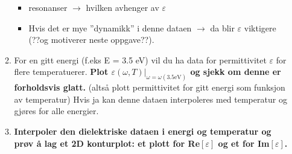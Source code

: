 \begin{itemize}
\begin{enumerate}
\begin{itemize}
            \item resonanser $\rightarrow$ hvilken avhenger av $\varepsilon$

            \item Hvis det er mye ''dynamikk'' i denne dataen $\rightarrow$ da blir $\varepsilon$
               viktigere (??og motiverer neste oppgave??).
            \end{itemize}
         \item 
            For en gitt energi (f.eks E = 3.5 eV) vil du ha data for permittivitet $\varepsilon$
            for flere temperatuerer. 
            \textbf{Plot $\varepsilon(\omega,T)\big|_{\omega=\omega(3.5\text{eV})}$ 
            og sjekk om denne er forholdsvis glatt.} (altså plott permittivitet for gitt energi
            som funksjon av temperatur) Hvis ja kan denne
            dataen interpoleres med temperatur og gjøres for alle energier.
         \item
            \textbf{Interpoler den dielektriske dataen i energi og temperatur og prøv å lag et
            2D konturplot: et plott for Re$[\varepsilon]$ og et for Im$[\varepsilon]$.}
   \end{enumerate}
 



\end{itemize}
